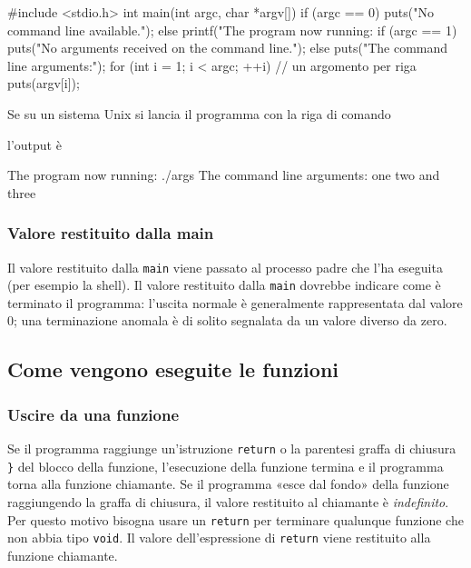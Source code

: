 \documentclass[11pt,a4paper]{article}
\begin{document}
\begin{esempio}
\begin{codice}
#include <stdio.h>
int main(int argc, char *argv[])
{
    if (argc == 0)
        puts("No command line available.");
    else {
        printf("The program now running: %
        if (argc == 1)
            puts("No arguments received on the command line.");
        else {
            puts("The command line arguments:");
            for (int i = 1; i < argc; ++i)    // un argomento per riga
                puts(argv[i]);
        }
    }
}
\end{codice}
Se su un sistema Unix si lancia il programma con la riga di comando
l'output è
\begin{risultato}
The program now running: ./args
The command line arguments:
one
two
and three
\end{risultato}
\end{esempio}

\subsubsection{Valore restituito dalla main}

Il valore restituito dalla \lstinline|main| viene passato al processo padre che l'ha eseguita (per esempio la shell). Il valore restituito dalla \lstinline|main| dovrebbe indicare come è terminato il programma: l'uscita normale è generalmente rappresentata dal valore $0$; una terminazione anomala è di solito segnalata da un valore diverso da zero.

\subsection{Come vengono eseguite le funzioni}

\subsubsection{Uscire da una funzione}

Se il programma raggiunge un'istruzione \lstinline|return| o la parentesi graffa di chiusura \lstinline|}| del blocco della funzione, l'esecuzione della funzione termina e il programma torna alla funzione chiamante. Se il programma «esce dal fondo» della funzione raggiungendo la graffa di chiusura, il valore restituito al chiamante è \emph{indefinito}. Per questo motivo bisogna usare un \lstinline|return| per terminare qualunque funzione che non abbia tipo \lstinline|void|. Il valore dell'espressione di \lstinline|return| viene restituito alla funzione chiamante.
\end{document}
